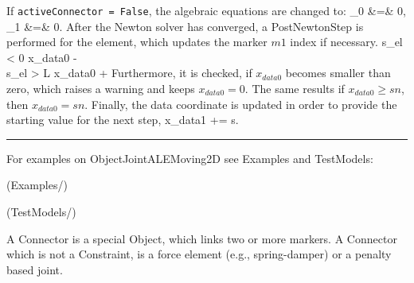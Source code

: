     \noindent If \texttt{activeConnector = False}, the algebraic equations are changed to:
    \bea
      \lambda_0 &=& 0,   \\
      \lambda_1 &=& 0.
    \eea   
%
    After the Newton solver has converged, a PostNewtonStep is performed for the element, which
    updates the marker $m1$ index if necessary.
    \bea
      s_{el} < 0 \quad \ra \quad x_{data0} \;-\! \nonumber\\
      s_{el} > L \quad \ra \quad x_{data0} \;+\!
    \eea
    Furthermore, it is checked, if $x_{data0}$ becomes smaller than zero, which raises a warning and keeps $x_{data0}=0$.
    The same results if $x_{data0}\ge sn$, then $x_{data0} = sn$.
    Finally, the data coordinate is updated in order to provide the starting value for the next step,
    \be
      x_{data1} \;+\!\!= s.
    \ee
%
\vspace{6pt}\par\noindent\rule{\textwidth}{0.4pt}
%
\noindent For examples on ObjectJointALEMoving2D see Examples and TestModels:
\bi
\item {} (Examples/)
\item {} (TestModels/)
\ei

%

\newpage
A Connector is a special Object, which links two or more markers. A Connector which is not a Constraint, is a force element (e.g., spring-damper) or a penalty based joint.

